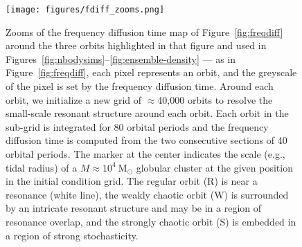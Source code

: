 \documentclass[letterpaper,12pt,preprint]{aastex}
\newcommand{\msun}{\ensuremath{\mathrm{M}_\odot}}
\begin{document}
\clearpage
\begin{figure}[p]
\begin{center}
\texttt{[image: figures/fdiff\_zooms.png]}
\caption{Zooms of the frequency diffusion time map of Figure~\ref{fig:freqdiff} around the three orbits highlighted in that figure and used in Figures~\ref{fig:nbodysims}--\ref{fig:ensemble-density} --- as in Figure~\ref{fig:freqdiff}, each pixel represents an orbit, and the greyscale of the pixel is set by the frequency diffusion time. Around each orbit, we initialize a new grid of $\approx$40,000 orbits to resolve the small-scale resonant structure around each orbit. Each orbit in the sub-grid is integrated for 80 orbital periods and the frequency diffusion time is computed from the two consecutive sections of 40 orbital periods. The marker at the center indicates the scale (e.g., tidal radius) of a $M \approx 10^4~\msun$ globular cluster at the given position in the initial condition grid. The regular orbit (R) is near a resonance (white line), the weakly chaotic orbit (W) is surrounded by an intricate resonant structure and may be in a region of resonance overlap, and the strongly chaotic orbit (S) is embedded in a region of strong stochasticity. }
\label{fig:fdiff-zooms}
\end{center}
\end{figure}
\end{document}

